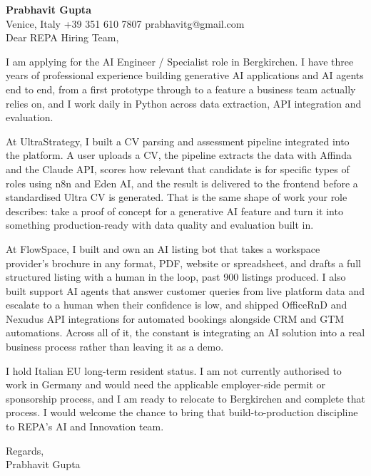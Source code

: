 \documentclass[a4paper,10.5pt]{article}
\begin{document}
\textbf{Prabhavit Gupta}\\
Venice, Italy \textbar{} +39 351 610 7807 \textbar{} prabhavitg@gmail.com\\[10pt]
Dear REPA Hiring Team,

I am applying for the AI Engineer / Specialist role in Bergkirchen. I have three years of professional experience building generative AI applications and AI agents end to end, from a first prototype through to a feature a business team actually relies on, and I work daily in Python across data extraction, API integration and evaluation.

At UltraStrategy, I built a CV parsing and assessment pipeline integrated into the platform. A user uploads a CV, the pipeline extracts the data with Affinda and the Claude API, scores how relevant that candidate is for specific types of roles using n8n and Eden AI, and the result is delivered to the frontend before a standardised Ultra CV is generated. That is the same shape of work your role describes: take a proof of concept for a generative AI feature and turn it into something production-ready with data quality and evaluation built in.

At FlowSpace, I built and own an AI listing bot that takes a workspace provider's brochure in any format, PDF, website or spreadsheet, and drafts a full structured listing with a human in the loop, past 900 listings produced. I also built support AI agents that answer customer queries from live platform data and escalate to a human when their confidence is low, and shipped OfficeRnD and Nexudus API integrations for automated bookings alongside CRM and GTM automations. Across all of it, the constant is integrating an AI solution into a real business process rather than leaving it as a demo.

I hold Italian EU long-term resident status. I am not currently authorised to work in Germany and would need the applicable employer-side permit or sponsorship process, and I am ready to relocate to Bergkirchen and complete that process. I would welcome the chance to bring that build-to-production discipline to REPA's AI and Innovation team.

Regards,\\
Prabhavit Gupta
\end{document}

